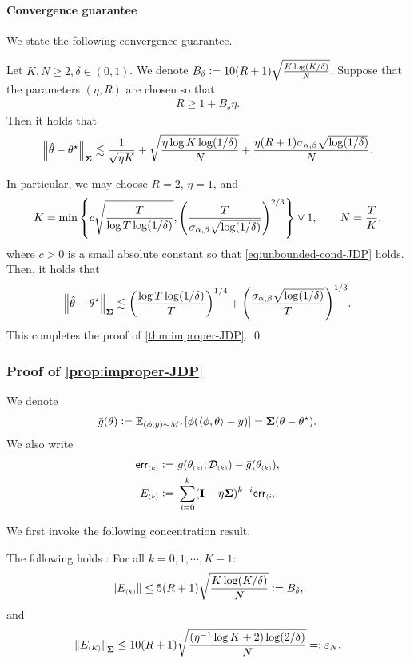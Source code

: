 \newcommand{\og}{\Bar{g}}
\newcommand{\gerr}[1]{\mathsf{err}\epk{#1}}
\paragraph{Convergence guarantee}
We state the following convergence guarantee.
\begin{proposition}\label{prop:improper-JDP}
Let $K,N\geq 2, \delta\in(0,1)$. We denote $B_\delta\mathrel{\mathop:}= 10(R+1)\sqrt{\frac{K\log(K/\delta)}{N}}$. Suppose that the parameters $(\eta, R)$ are chosen so that
\begin{align}\label{eq:unbounded-cond-JDP}
    R\geq 1+B_\delta \eta.
\end{align}
Then it holds that \whp
\begin{align*}
    \left\|\hat{\theta}-\theta^\star\right\|_{\boldsymbol{\Sigma}}\lesssim \frac{1}{\sqrt{\eta K}}+\sqrt{\frac{\eta\log K\log(1/\delta)}{ N}}+\frac{\eta (R+1)\sigma_{\alpha,\beta}\sqrt{\log(1/\delta)}}{N}.
\end{align*}
\end{proposition}

In particular, we may choose $R=2$, $\eta=1$, and
\begin{align*}
    K=\min\left\{ c\sqrt{\frac{T}{\log T \log(1/\delta)}} , {\left( \frac{T}{\sigma_{\alpha,\beta} \sqrt{\log(1/\delta)}} \right)}^{2/3}\right\}\vee 1, \qquad
    N=\frac{T}{K}, 
\end{align*}
where $c>0$ is a small absolute constant so that \eqref{eq:unbounded-cond-JDP} holds. Then, it holds that
\begin{align*}
    \left\|\hat{\theta}-\theta^\star\right\|_{\boldsymbol{\Sigma}}\lesssim {\left( \frac{\log T\log(1/\delta)}{T} \right)}^{1/4}+{\left( \frac{\sigma_{\alpha,\beta} \sqrt{\log(1/\delta)}}{T} \right)}^{1/3}.
\end{align*}
This completes the proof of \cref{thm:improper-JDP}.
\qed

\subsubsection{Proof of \cref{prop:improper-JDP}}
We denote
\begin{align*}
    \og(\theta)\defeq \Exy{\x(\lr \x,\theta\rr-y)}=\bSigma (\theta-\ths).
\end{align*}
We also write
\begin{align*}
    \gerr{k}\defeq&~ g(\theta\kk;\cD\kk)-\og(\theta\kk), \\
    E\kk\defeq&~ \sum_{i=0}^{k} (\id-\eta\bSigma)^{k-i} \gerr{i}.
\end{align*}

We first invoke the following concentration result.
\begin{lemma}\label{lem:improper-JDP-concen}
The following holds \whp:
For all $k=0,1,\cdots,K-1$:
\begin{align*}
    \left\|E_{\scriptscriptstyle{ (k) }}\right\|\leq 5(R+1)\sqrt{\frac{K\log(K/\delta)}{N}}\mathrel{\mathop:}= B_\delta,
\end{align*}
and
\begin{align*}
    \left\|E_{\scriptscriptstyle{ (K) }}\right\|_{\boldsymbol{\Sigma}}\leq 10(R+1)\sqrt{\frac{(\eta^{-1}\log K+2)\log(2/\delta)}{N}}=:\varepsilon_N.
\end{align*}
\end{lemma}

